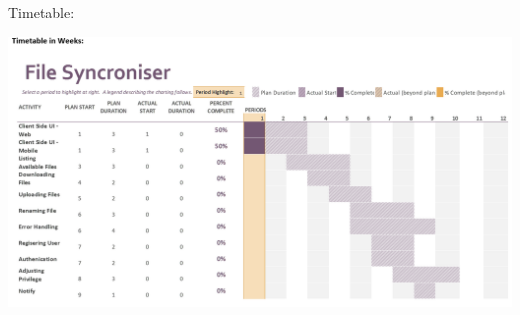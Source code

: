 \documentclass[11pt]{informatics-report}
\begin{document}
Timetable:

\includegraphics[angle=90, width=\textwidth,height=\textheight,keepaspectratio]{timetable}


\end{document}
